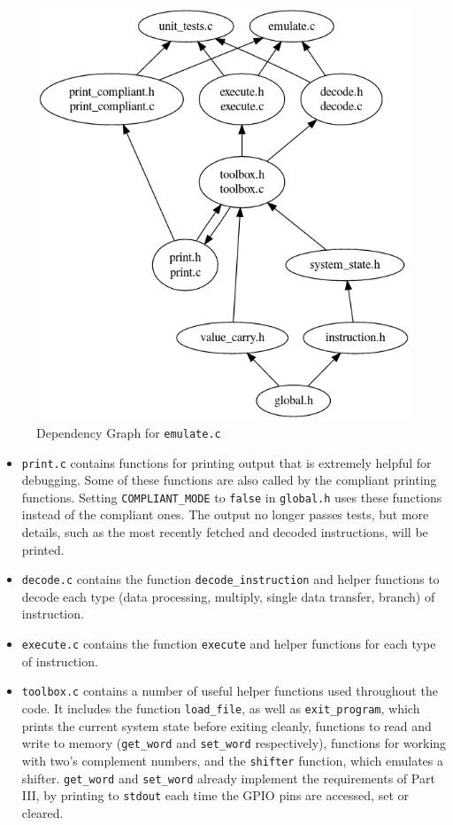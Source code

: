 \documentclass[10pt]{article}
\begin{document}
\begin{figure}[H]
\begin{minipage}{0.35\linewidth}
\centering
\includegraphics[scale=0.28]{Checkpoint/emulate.png}
\caption{Dependency Graph for \texttt{emulate.c}}

\end{minipage}
\end{figure}

\begin{itemize}
\item \texttt{print.c} contains functions for printing output that is extremely helpful for debugging. Some of these functions are also called by the compliant printing functions. Setting \texttt{COMPLIANT\_MODE} to \texttt{false} in \texttt{global.h} uses these functions instead of the compliant ones. The output no longer passes tests, but more details, such as the most recently fetched and decoded instructions, will be printed.
\item \texttt{decode.c} contains the function \texttt{decode\_instruction} and helper functions to decode each type (data processing, multiply, single data transfer, branch) of instruction.
\item \texttt{execute.c} contains the function \texttt{execute} and helper functions for each type of instruction.
\item \texttt{toolbox.c} contains a number of useful helper functions used throughout the code. It includes the function \texttt{load\_file}, as well as \texttt{exit\_program}, which prints the current system state before exiting cleanly, functions to read and write to memory (\texttt{get\_word} and \texttt{set\_word} respectively), functions for working with two's complement numbers, and the \texttt{shifter} function, which emulates a shifter. \texttt{get\_word} and \texttt{set\_word} already implement the requirements of Part III, by printing to \texttt{stdout} each time the GPIO pins are accessed, set or cleared.
\end{itemize}
\end{document}
